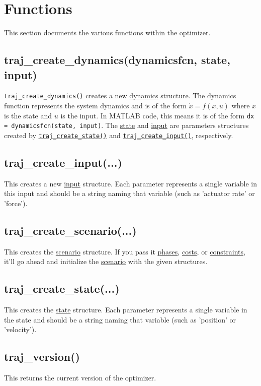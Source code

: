 \documentclass{article}
\begin{document}
	\section{Functions}
		This section documents the various functions within the optimizer.

		\subsection{traj\_create\_dynamics(dynamicsfcn, state, input)}
			\lstinline|traj_create_dynamics()| creates a new \hyperref[sec:dynamics]{dynamics} structure. The dynamics function
			represents the system dynamics and is of the form $\dot{x} = f(x, u)$ where $x$ is the state and $u$ is the input.
			In MATLAB code, this means it is of the form \lstinline|dx = dynamicsfcn(state, input)|. The \hyperref[sec:state]{state}
			and \hyperref[sec:input]{input} are parameters structures created by
			\hyperref[subsec:traj_create_state]{\lstinline|traj_create_state()|} and
			\hyperref[subsec:traj_create_input]{\lstinline|traj_create_input()|}, respectively.

		\subsection{traj\_create\_input(...)}
			\label{subsec:traj_create_input}
			This creates a new \hyperref[sec:input]{input} structure. Each parameter represents a single variable in this input
			and should be a string naming that variable (such as 'actuator rate' or 'force').

		\subsection{traj\_create\_scenario(...)}
			This creates the \hyperref[sec:scenario]{scenario} structure. If you pass it \hyperref[sec:phase]{phases},
			\hyperref[sec:cost]{costs}, or \hyperref[sec:constraint]{constraints}, it'll go ahead and
			initialize the \hyperref[sec:scenario]{scenario} with the given structures.

		\subsection{traj\_create\_state(...)}
			\label{subsec:traj_create_state}
			This creates the \hyperref[sec:state]{state} structure. Each parameter represents a single variable in the state
			and should be a string naming that variable (such as 'position' or 'velocity').

		\subsection{traj\_version()}
			This returns the current version of the optimizer.
\end{document}
